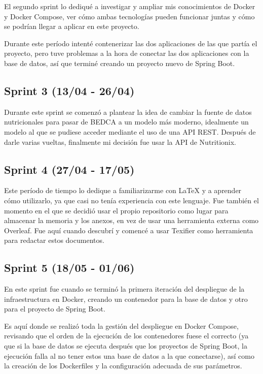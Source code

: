 El segundo sprint lo dediqué a investigar y ampliar mis conocimientos de Docker y Docker Compose, ver cómo ambas tecnologías pueden funcionar juntas y cómo se podrían llegar a aplicar en este proyecto. 

Durante este período intenté contenerizar las dos aplicaciones de las que partía el proyecto, pero tuve problemas a la hora de conectar las dos aplicaciones con la base de datos, así que terminé creando un proyecto nuevo de Spring Boot.


\subsection{Sprint 3 (13/04 - 26/04)}

Durante este sprint se comenzó a plantear la idea de cambiar la fuente de datos nutricionales para pasar de BEDCA a un modelo más moderno, idealmente un modelo al que se pudiese acceder mediante el uso de una API REST. Después de darle varias vueltas, finalmente mi decisión fue usar la API de Nutritionix.


\subsection{Sprint 4 (27/04 - 17/05)}

Este período de tiempo lo dedique a familiarizarme con LaTeX y a aprender cómo utilizarlo, ya que casi no tenía experiencia con este lenguaje. Fue también el momento en el que se decidió usar el propio repositorio como lugar para almacenar la memoria y los anexos, en vez de usar una herramienta externa como Overleaf. Fue aquí cuando descubrí y comencé a usar Texifier como herramienta para redactar estos documentos.


\subsection{Sprint 5 (18/05 - 01/06)}

En este sprint fue cuando se terminó la primera iteración del despliegue de la infraestructura en Docker, creando un contenedor para la base de datos y otro para el proyecto de Spring Boot.

Es aquí donde se realizó toda la gestión del despliegue en Docker Compose, revisando que el orden de la ejecución de los contenedores fuese el correcto (ya que si la base de datos se ejecuta después que los proyectos de Spring Boot, la ejecución falla al no tener estos una base de datos a la que conectarse), así como la creación de los Dockerfiles y la configuración adecuada de sus parámetros. 

